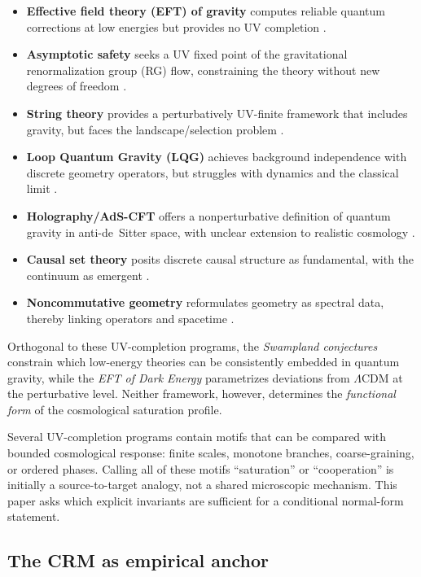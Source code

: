 \documentclass[aps,prd,twocolumn,superscriptaddress,nofootinbib]{revtex4-2}
\begin{document}
\begin{itemize}
\item \textbf{Effective field theory (EFT) of gravity} computes reliable quantum corrections at low energies but provides no UV completion \cite{Donoghue1994}.
\item \textbf{Asymptotic safety} seeks a UV fixed point of the gravitational renormalization group (RG) flow, constraining the theory without new degrees of freedom \cite{Weinberg1979,Reuter1998,Percacci2017}.
\item \textbf{String theory} provides a perturbatively UV-finite framework that includes gravity, but faces the landscape/selection problem \cite{Polchinski1998}.
\item \textbf{Loop Quantum Gravity (LQG)} achieves background independence with discrete geometry operators, but struggles with dynamics and the classical limit \cite{Rovelli2004,Thiemann2007}.
\item \textbf{Holography/AdS-CFT} offers a nonperturbative definition of quantum gravity in anti-de~Sitter space, with unclear extension to realistic cosmology \cite{Maldacena1999}.
\item \textbf{Causal set theory} posits discrete causal structure as fundamental, with the continuum as emergent \cite{Sorkin2003,Surya2019}.
\item \textbf{Noncommutative geometry} reformulates geometry as spectral data, thereby linking operators and spacetime \cite{Connes1994}.
\end{itemize}

Orthogonal to these UV-completion programs, the \textit{Swampland conjectures} \cite{Obied2018} constrain which low-energy theories can be consistently embedded in quantum gravity, while the \textit{EFT of Dark Energy} \cite{Gubitosi2013} parametrizes deviations from $\Lambda$CDM at the perturbative level. Neither framework, however, determines the \textit{functional form} of the cosmological saturation profile.

Several UV-completion programs contain motifs that can be compared with bounded cosmological response: finite scales, monotone branches, coarse-graining, or ordered phases. Calling all of these motifs ``saturation'' or ``cooperation'' is initially a source-to-target analogy, not a shared microscopic mechanism. This paper asks which explicit invariants are sufficient for a conditional normal-form statement.

\subsection{The CRM as empirical anchor}
\end{document}
